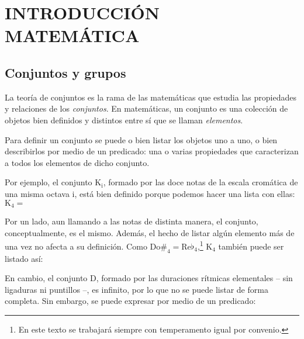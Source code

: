 \chapter{INTRODUCCIÓN MATEMÁTICA}
	\section{Conjuntos y grupos}
		La teoría de conjuntos es la rama de las matemáticas que estudia las propiedades y relaciones de los \emph{conjuntos}. En matemáticas, un conjunto es una colección de objetos bien definidos y distintos entre sí que se llaman \emph{elementos}.
	
		Para definir un conjunto se puede o bien listar los objetos uno a uno, o bien describirlos por medio de un predicado: una o varias propiedades que caracterizan a todos los elementos de dicho conjunto.

		Por ejemplo, el conjunto K$_\text{i}$, formado por las doce notas de la escala cromática de una misma octava i, está bien definido porque podemos hacer una lista con ellas: $\text{K}_\text{4} = $
		
		
		Por un lado, aun llamando a las notas de distinta manera, el conjunto, conceptualmente, es el mismo. Además, el hecho de listar algún elemento más de una vez no afecta a su definición. Como $\text{Do\#}_\text{4} = \text{Re}\flat_\text{4}$,\footnote{En este texto se trabajará siempre con temperamento igual por convenio.}  $\text{K}_\text{4}$ también puede ser listado así:
		
	
		En cambio, el conjunto D, formado por las duraciones rítmicas elementales -- sin ligaduras ni puntillos --, es infinito, por lo que no se puede listar de forma completa. Sin embargo, se puede expresar por medio de un predicado:
		
	
